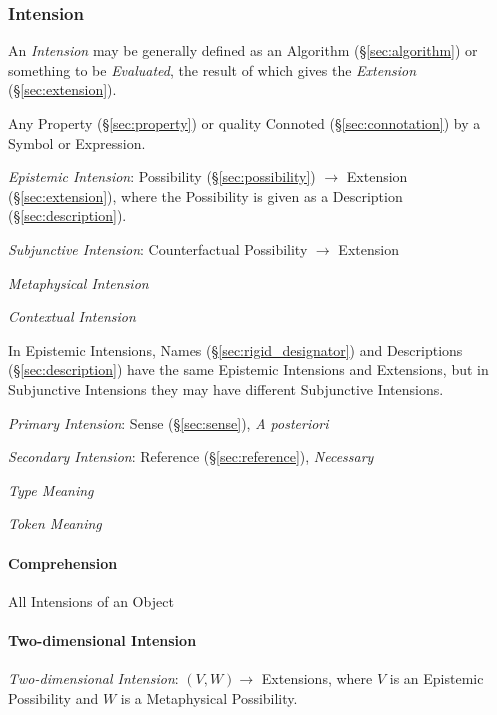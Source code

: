 \subsubsection{Intension}\label{sec:intension}\cite{chalmers02}

An \emph{Intension} may be generally defined as an Algorithm
(\S\ref{sec:algorithm}) or something to be \emph{Evaluated}, the result of which
gives the \emph{Extension} (\S\ref{sec:extension}).

Any Property (\S\ref{sec:property}) or quality Connoted
(\S\ref{sec:connotation}) by a Symbol or Expression.

\emph{Epistemic Intension}: Possibility (\S\ref{sec:possibility}) $\rightarrow$
Extension (\S\ref{sec:extension}), where the Possibility is given as a
Description (\S\ref{sec:description}).

\emph{Subjunctive Intension}: Counterfactual Possibility $\rightarrow$ Extension

\emph{Metaphysical Intension} %

\emph{Contextual Intension}

In Epistemic Intensions, Names (\S\ref{sec:rigid_designator}) and Descriptions
(\S\ref{sec:description}) have the same Epistemic Intensions and Extensions, but
in Subjunctive Intensions they may have different Subjunctive Intensions.

\emph{Primary Intension}: Sense (\S\ref{sec:sense}), \emph{A
  posteriori}

\emph{Secondary Intension}: Reference (\S\ref{sec:reference}),
\emph{Necessary}

\emph{Type Meaning}

\emph{Token Meaning}



\paragraph{Comprehension}\label{sec:comprehension}\hfill

All Intensions of an Object



\paragraph{Two-dimensional Intension}\label{sec:twodimensional_intension}\hfill

\emph{Two-dimensional Intension}: $(V,W) \rightarrow$ Extensions,
where $V$ is an Epistemic Possibility and $W$ is a Metaphysical
Possibility.



